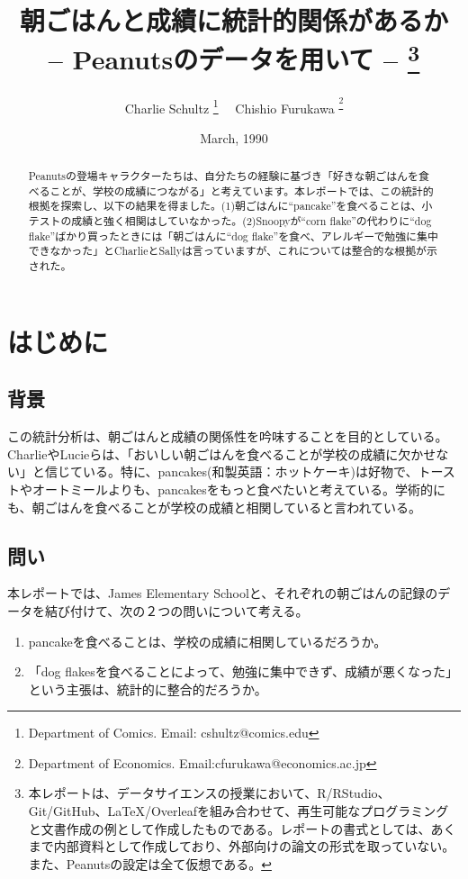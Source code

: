 \documentclass[xelatex,ja=standard]{bxjsarticle}
\title{朝ごはんと成績に統計的関係があるか \\ -- Peanutsのデータを用いて -- \thanks{本レポートは、データサイエンスの授業において、R/RStudio、Git/GitHub、LaTeX/Overleafを組み合わせて、再生可能なプログラミングと文書作成の例として作成したものである。レポートの書式としては、あくまで内部資料として作成しており、外部向けの論文の形式を取っていない。また、Peanutsの設定は全て仮想である。}}
\author{Charlie Schultz
\thanks{Department of Comics. Email: cshultz@comics.edu}  \ \  Chishio Furukawa
\textsuperscript\thanks{Department of Economics. Email:cfurukawa@economics.ac.jp}}
\date{March, 1990}
\begin{document}
\renewcommand\footnotelayout{\small}
\sffamily\mdseries

\maketitle

\vspace{-10pt}\begin{abstract}
\begin{spacing}{1}
\noindent 
Peanutsの登場キャラクターたちは、自分たちの経験に基づき「好きな朝ごはんを食べることが、学校の成績につながる」と考えています。本レポートでは、この統計的根拠を探索し、以下の結果を得ました。(1)朝ごはんに``pancake''を食べることは、小テストの成績と強く相関はしていなかった。(2)Snoopyが``corn flake''の代わりに``dog flake''ばかり買ったときには「朝ごはんに``dog flake''を食べ、アレルギーで勉強に集中できなかった」とCharlieとSallyは言っていますが、これについては整合的な根拠が示された。\\

\end{spacing}
\end{abstract}

\newpage

\section{はじめに}

\subsection{背景} 

この統計分析は、朝ごはんと成績の関係性を吟味することを目的としている。CharlieやLucieらは、「おいしい朝ごはんを食べることが学校の成績に欠かせない」と信じている。特に、pancakes(和製英語：ホットケーキ)は好物で、トーストやオートミールよりも、pancakesをもっと食べたいと考えている。学術的にも、朝ごはんを食べることが学校の成績と相関していると言われている\citep{Furuse2020b}。

\subsection{問い}

本レポートでは、James Elementary Schoolと、それぞれの朝ごはんの記録のデータを結び付けて、次の２つの問いについて考える。

\begin{enumerate}
\item pancakeを食べることは、学校の成績に相関しているだろうか。
\item 「dog flakesを食べることによって、勉強に集中できず、成績が悪くなった」という主張は、統計的に整合的だろうか。
\end{enumerate}
\end{document}
